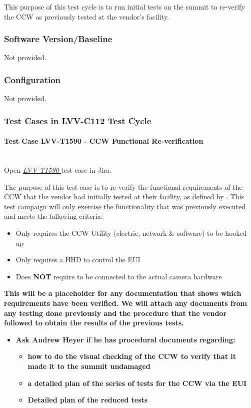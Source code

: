 \documentclass[SE,lsstdraft,STR,toc]{lsstdoc}
\providecommand{\tightlist}{
  \setlength{\itemsep}{0pt}\setlength{\parskip}{0pt}}
\begin{document}
This purpose of this test cycle is to run initial tests on the summit to
re-verify the CCW as previously tested at the vendor's facility.


\subsubsection{Software Version/Baseline}
Not provided.

\subsubsection{Configuration}
Not provided.

\subsubsection{Test Cases in LVV-C112 Test Cycle}

\paragraph{Test Case LVV-T1590 - CCW Functional Re-verification
 }\mbox{}\\

Open  \href{https://jira.lsstcorp.org/secure/Tests.jspa#/testCase/LVV-T1590}{\textit{ LVV-T1590 } }
test case in Jira.

The purpose of this test case is to re-verify the functional
requirements of the CCW that the vendor had initially tested at their
facility, as defined by . This test campaign will only exercise
the functionality that was previously executed and meets the following
criteria:

\begin{itemize}
\tightlist
\item
  Only requires the CCW Utility (electric, network \& software) to be
  hooked up
\item
  Only requires a HHD to control the EUI
\item
  Does \textbf{NOT} require to be connected to the actual camera
  hardware
\end{itemize}

\textbf{{This will be a placeholder for any documentation that shows
which requirements have been verified. We will attach any documents from
any testing done previously and the procedure that the vendor followed
to obtain the results of the previous tests.}}

\begin{itemize}
\tightlist
\item
  \textbf{{Ask Andrew Heyer if he has procedural documents regarding:}}

  \begin{itemize}
  \tightlist
  \item
    \textbf{{how to do the visual checking of the CCW to verify that it
    made it to the summit undamaged}}
  \item
    \textbf{{a detailed plan of the series of tests for the CCW via the
    EUI}}
  \item
    {\textbf{Detailed plan of the reduced tests}}
  \end{itemize}
\end{itemize}
\end{document}
